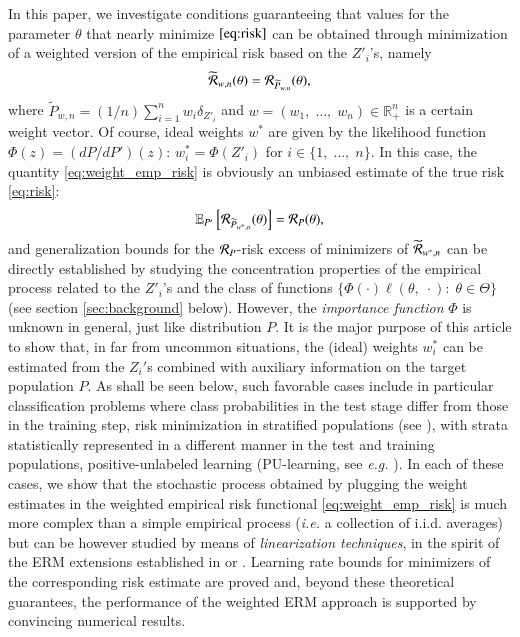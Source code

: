 \documentclass[12pt]{article}
\newcommand{\cR}{{\cal R}}
\begin{document}
 In this paper, we investigate conditions guaranteeing that values for the parameter $\theta$ that nearly minimize $\eqref{eq:risk}$ can be obtained through minimization of a weighted version of the empirical risk based on the $Z'_i$'s, namely
\begin{equation}\label{eq:weight_emp_risk}
\widetilde{\cR}_{w,n}(\theta)=\cR_{\widetilde{P}_{w,n}}(\theta),
\end{equation}
where $\widetilde{P}_{w,n}=(1/n)\sum_{i=1}^nw_i\delta_{Z'_i}$ and $w=(w_1,\;\ldots,\; w_n)\in \mathbb{R}_+^n$ is a certain weight vector. Of course, ideal weights $w^*$ are given by the likelihood function $\Phi(z)=(dP/dP')(z)$: $w_i^*=\Phi(Z'_i)$ for $i\in \{1,\; \ldots,\; n \}$. In this case, the quantity \eqref{eq:weight_emp_risk} is obviously an unbiased estimate of the true risk \eqref{eq:risk}:
\begin{equation}
\mathbb{E}_{P'}\left[ \cR_{\widetilde{P}_{w^*,n}}(\theta)   \right]=\cR_P(\theta),
 \end{equation}
 and generalization bounds for the $\cR_{P}$-risk excess of minimizers of $\widetilde{\cR}_{w^*,n}$ can be directly established by studying the concentration properties of the empirical process related to the $Z'_i$'s and the class of functions $\{\Phi(\cdot)\ell(\theta,\; \cdot):\; \theta\in \Theta  \}$ (see section \ref{sec:background} below). However, the \textit{importance function} $\Phi$ is unknown in general, just like distribution $P$. It is the major purpose of this article to show that, in far from uncommon situations, the (ideal) weights $w_i^*$ can be estimated from the $Z_i'$s combined with auxiliary information on the target population $P$. As shall be seen below, such favorable cases include in particular classification problems where class probabilities in the test stage differ from those in the training step, risk minimization in stratified populations (see \cite{Bekker2018}), with strata statistically represented in a different manner in the test and training populations, positive-unlabeled learning (PU-learning, see \textit{e.g.} \cite{du2014analysis}). In each of these cases, we show that the stochastic process obtained by plugging the weight estimates in the weighted empirical risk functional \eqref{eq:weight_emp_risk} is much more complex than a simple empirical process (\textit{i.e.} a collection of i.i.d. averages) but can be however studied by means of \textit{linearization techniques}, in the spirit of the ERM extensions established in \cite{Clemencon08Ranking} or \cite{CV08NIPS1}. Learning rate bounds for minimizers of the corresponding risk estimate are proved and, beyond these theoretical guarantees, the performance of the weighted ERM approach is supported by convincing numerical results.
\end{document}
